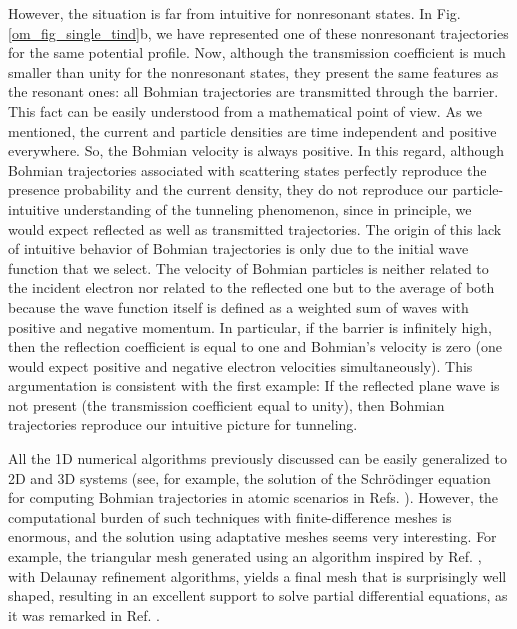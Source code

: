 \documentclass[onecolumn,nofootinbib, secnumarabic, amsmath, nobibnotes,11pt,aps,pra]{revtex4-1}
\newcommand{\fref}[1]{Fig. \ref{#1}}
\begin{document}
However, the situation is far from intuitive for nonresonant states. In \fref{om_fig_single_tind}b, we have represented one of these nonresonant trajectories for the same potential profile. Now, although the transmission coefficient is much smaller than unity for the nonresonant states, they present the same features as the resonant ones: all Bohmian trajectories are transmitted through the barrier. This fact can be easily understood from a mathematical point of view. As we mentioned, the current and particle densities are time independent and positive everywhere. So, the Bohmian velocity is always positive. In this regard, although Bohmian trajectories associated with scattering states perfectly reproduce the presence probability and the current density, they do not reproduce our particle-intuitive understanding of the tunneling phenomenon, since in principle, we would expect reflected as well as transmitted trajectories. The origin of this lack of intuitive behavior of Bohmian trajectories is only due to the initial wave function that we select. The velocity of Bohmian particles is neither related to the incident electron nor related to the reflected one but to the average of both because the wave function itself is defined as a weighted sum of waves with positive and negative momentum. In particular, if the barrier is infinitely high, then the reflection coefficient is equal to one and Bohmian's velocity is zero (one would expect positive and negative electron velocities simultaneously). This argumentation is consistent with the first example: If the reflected plane wave is not present (the transmission coefficient equal to unity), then Bohmian trajectories reproduce our intuitive picture for tunneling.

All the 1D numerical algorithms previously discussed can be easily
generalized to 2D and 3D systems (see, for example, the solution of
the Schr\"odinger equation for computing Bohmian trajectories in
atomic scenarios in Refs. \cite{om.mompart1,om.mompart2}). However,
the computational burden of such techniques with finite-difference
meshes is enormous, and the solution using adaptative meshes seems
very interesting. For example, the triangular mesh generated using
an algorithm inspired by Ref. \cite{om.Persson}, with Delaunay refinement
algorithms, yields a final mesh that is surprisingly well shaped,
resulting in an excellent support to solve partial differential
equations, as it was remarked in Ref. \cite{om.Pinto}.\vspace*{-9pt}
\end{document}

